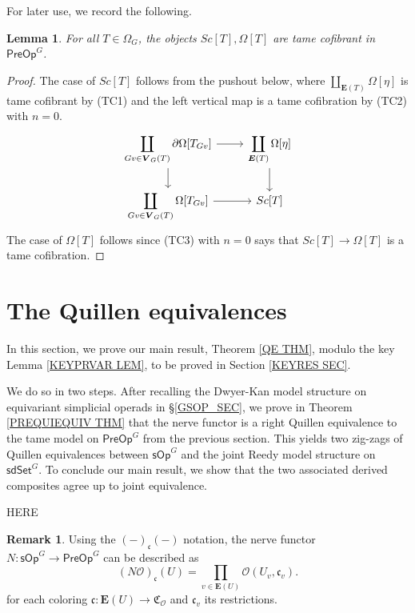\documentclass[a4paper,10pt
,draft
]{article}%
\numberwithin{equation}{section}
\numberwithin{figure}{section}
\newtheorem{lemma}[equation]{Lemma}%
\theoremstyle{definition} %
\newtheorem{remark}[equation]{Remark}%
\newcommand{\sOp}{\ensuremath{\mathsf{sOp}}}%
\newcommand{\sdSet}{\mathsf{sdSet}}
\newcommand{\PreOp}{\mathsf{PreOp}}
\renewcommand{\O}{\ensuremath{\mathcal O}}
\newcommand{\1}{\ensuremath{\mathbbm 1}}%
\begin{document}
For later use, we record the following.

\begin{lemma}\label{OMEGATTAME_LEM}
	For all $T \in \Omega_G$, the objects $Sc[T],\Omega[T]$ are tame cofibrant in $\mathsf{PreOp}^G$.
\end{lemma}

\begin{proof}
	The case of $Sc[T]$ follows from the pushout below, 
	where $\coprod_{\boldsymbol{E}(T)}\Omega[\eta]$
	is tame cofibrant by (TC1) and the left vertical map is 
	a tame cofibration by (TC2) with $n=0$.
	\[
	\begin{tikzcd}
	\displaystyle{
		\coprod_{Gv \in \boldsymbol{V}_G(T)} \partial\Omega[T_{Gv}]
	}
	\arrow[d] \arrow[r]
	&
	\displaystyle{
		\coprod_{\boldsymbol{E}(T)} \Omega[\eta]
	}
	\arrow[d]
	\\
	\displaystyle{
		\coprod_{Gv \in \boldsymbol{V}_G(T)} \Omega[T_{Gv}]
	}
	\arrow[r]
	&
	Sc[T]
	\end{tikzcd}
	\]
	The case of $\Omega[T]$
	follows since (TC3) with $n=0$
	says that $Sc[T] \to \Omega[T]$ is a tame cofibration.
\end{proof}






\section{The Quillen equivalences}
\label{QE_SEC}

In this section, we prove our main result, Theorem \ref{QE THM}, modulo the key Lemma \ref{KEYPRVAR LEM}, to be proved in Section \ref{KEYRES SEC}.

We do so in two steps.
After recalling the Dwyer-Kan model structure on equivariant simplicial operads in \S \ref{GSOP_SEC},
we prove in Theorem \ref{PREQUIEQUIV THM} that the nerve functor is a right Quillen equivalence to 
the tame model on $\PreOp^G$ from the previous section.
This yields two zig-zags of Quillen equivalences between $\sOp^G$ and the joint Reedy model structure on $\sdSet^G$.
To conclude our main result, we show that the two associated derived composites agree up to joint equivalence.


{\color{red} HERE}


\begin{remark}\label{ALTNER REM}
	Using the $(-)_{\mathfrak{c}}(-)$ notation,
	the nerve functor
	$N \colon \mathsf{sOp}^G \to \mathsf{PreOp}^G$
	can be described as
	\[
	(N \O)_{\mathfrak{c}} (U) = 
	\prod_{v \in \boldsymbol{E}(U)}
	\O(U_v,\mathfrak{c}_v).
	\]
	for each coloring $\mathfrak{c} \colon \boldsymbol{E}(U) \to 
	\mathfrak{C}_{\O}$
	and $\mathfrak{c}_v$ its restrictions.
\end{remark}
\end{document}

